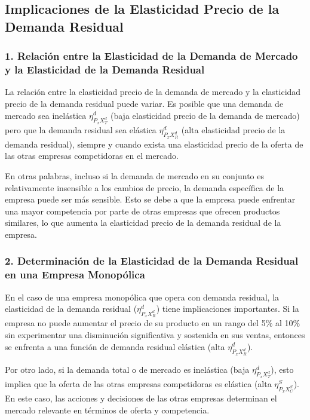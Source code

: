 \documentclass[
  doc,
  floatsintext,
  longtable,
  a4paper,
  nolmodern,
  notxfonts,
  notimes,
  12pt,
  colorlinks=true,linkcolor=blue,citecolor=blue,urlcolor=blue]{apa7}
\begin{document}
\subsection{Implicaciones de la Elasticidad Precio de la Demanda
Residual}\label{implicaciones-de-la-elasticidad-precio-de-la-demanda-residual}

\subsubsection{1. Relación entre la Elasticidad de la Demanda de Mercado
y la Elasticidad de la Demanda
Residual}\label{relaciuxf3n-entre-la-elasticidad-de-la-demanda-de-mercado-y-la-elasticidad-de-la-demanda-residual}

La relación entre la elasticidad precio de la demanda de mercado y la
elasticidad precio de la demanda residual puede variar. Es posible que
una demanda de mercado sea inelástica \(\eta_{P_{x}X_T^d}^d\) (baja
elasticidad precio de la demanda de mercado) pero que la demanda
residual sea elástica \(\eta_{P_{x}X_R^d}^d\) (alta elasticidad precio
de la demanda residual), siempre y cuando exista una elasticidad precio
de la oferta de las otras empresas competidoras en el mercado.

En otras palabras, incluso si la demanda de mercado en su conjunto es
relativamente insensible a los cambios de precio, la demanda específica
de la empresa puede ser más sensible. Esto se debe a que la empresa
puede enfrentar una mayor competencia por parte de otras empresas que
ofrecen productos similares, lo que aumenta la elasticidad precio de la
demanda residual de la empresa.

\subsubsection{2. Determinación de la Elasticidad de la Demanda Residual
en una Empresa
Monopólica}\label{determinaciuxf3n-de-la-elasticidad-de-la-demanda-residual-en-una-empresa-monopuxf3lica}

En el caso de una empresa monopólica que opera con demanda residual, la
elasticidad de la demanda residual (\(\eta_{P_{x}X_R^d}^d\)) tiene
implicaciones importantes. Si la empresa no puede aumentar el precio de
su producto en un rango del 5\% al 10\% sin experimentar una disminución
significativa y sostenida en sus ventas, entonces se enfrenta a una
función de demanda residual elástica (alta \(\eta_{P_{x}X_R^d}^d\)).

Por otro lado, si la demanda total o de mercado es inelástica (baja
\(\eta_{P_{x}X_T^d}^d\)), esto implica que la oferta de las otras
empresas competidoras es elástica (alta \(\eta_{P_{x}X_C^S}^S\)). En
este caso, las acciones y decisiones de las otras empresas determinan el
mercado relevante en términos de oferta y competencia.
\end{document}
